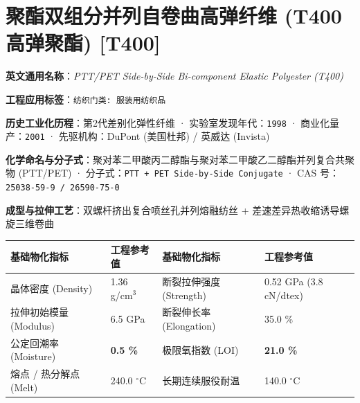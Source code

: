 \documentclass[11pt,openright,twoside,UTF8]{ctexbook}
\begin{document}
\section{聚酯双组分并列自卷曲高弹纤维 (T400高弹聚酯) [T400]}
\label{sec:t400}

\noindent\textbf{英文通用名称}：\textit{PTT/PET Side-by-Side Bi-component Elastic Polyester (T400)}\par
\noindent\textbf{工程应用标签}：\texttt{纺织门类: 服装用纺织品}\par
\noindent\textbf{历史工业化历程}：第2代差别化弹性纤维 · 实验室发现年代：\texttt{1998} · 商业化量产：\texttt{2001} · 先驱机构：DuPont (美国杜邦) / 英威达 (Invista)\par
\noindent\textbf{化学命名与分子式}：聚对苯二甲酸丙二醇酯与聚对苯二甲酸乙二醇酯并列复合共聚物 (PTT/PET) · 分子式：\texttt{PTT + PET Side-by-Side Conjugate} · CAS 号：\texttt{25038-59-9 / 26590-75-0}\par
\noindent\textbf{成型与拉伸工艺}：双螺杆挤出复合喷丝孔并列熔融纺丝 + 差速差异热收缩诱导螺旋三维卷曲\par

\vspace{0.15cm}
\begin{center}
\small
\begin{tabularx}{\textwidth}{p{3.8cm}Xp{3.8cm}X}
\toprule
\textbf{基础物化指标} & \textbf{工程参考值} & \textbf{基础物化指标} & \textbf{工程参考值} \\
\midrule
晶体密度 (Density) & 1.36 g/cm$^3$ & 断裂拉伸强度 (Strength) & 0.52 GPa (3.8 cN/dtex) \\
拉伸初始模量 (Modulus) & 6.5 GPa & 断裂伸长率 (Elongation) & 35.0 \% \\
公定回潮率 (Moisture) & \textbf{0.5 \%} & 极限氧指数 (LOI) & \textbf{21.0 \%} \\
熔点 / 热分解点 (Melt) & 240.0 $^\circ\mathrm{C}$ & 长期连续服役耐温 & 140.0 $^\circ\mathrm{C}$ \\
\bottomrule
\end{tabularx}
\end{center}
\vspace{0.15cm}
\end{document}
